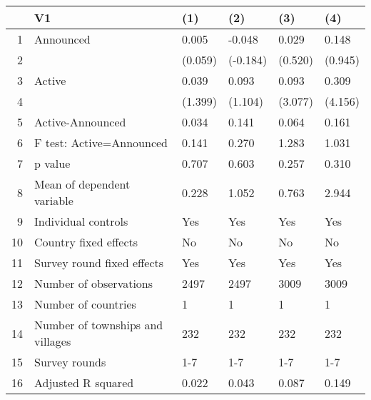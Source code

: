 \begin{table}[ht]
\centering
\begin{tabular}{rlllll}
  \hline
 & V1 & (1) & (2) & (3) & (4) \\ 
  \hline
1 & Announced & 0.005 & -0.048 & 0.029 & 0.148 \\ 
  2 &  & (0.059) & (-0.184) & (0.520) & (0.945) \\ 
  3 & Active & 0.039 & 0.093 & 0.093 & 0.309 \\ 
  4 &  & (1.399) & (1.104) & (3.077) & (4.156) \\ 
  5 & Active-Announced & 0.034 & 0.141 & 0.064 & 0.161 \\ 
  6 & F test: Active=Announced & 0.141 & 0.270 & 1.283 & 1.031 \\ 
  7 & p value & 0.707 & 0.603 & 0.257 & 0.310 \\ 
  8 & Mean of dependent variable & 0.228 & 1.052 & 0.763 & 2.944 \\ 
  9 & Individual controls & Yes & Yes & Yes & Yes \\ 
  10 & Country fixed effects & No & No & No & No \\ 
  11 & Survey round fixed effects & Yes & Yes & Yes & Yes \\ 
  12 & Number of observations & 2497 & 2497 & 3009 & 3009 \\ 
  13 & Number of countries & 1 & 1 & 1 & 1 \\ 
  14 & Number of townships and villages & 232 & 232 & 232 & 232 \\ 
  15 & Survey rounds & 1-7 & 1-7 & 1-7 & 1-7 \\ 
  16 & Adjusted R squared & 0.022 & 0.043 & 0.087 & 0.149 \\ 
   \hline
\end{tabular}
\end{table}
